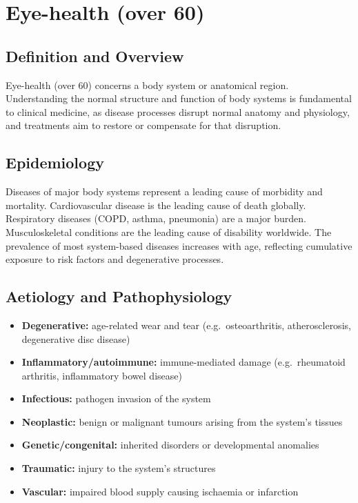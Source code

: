 \chapter{Eye-health (over 60)}

\section*{Definition and Overview}
Eye-health (over 60) concerns a body system or anatomical region. Understanding the normal structure and function of body systems is fundamental to clinical medicine, as disease processes disrupt normal anatomy and physiology, and treatments aim to restore or compensate for that disruption.

\section*{Epidemiology}
Diseases of major body systems represent a leading cause of morbidity and mortality. Cardiovascular disease is the leading cause of death globally. Respiratory diseases (COPD, asthma, pneumonia) are a major burden. Musculoskeletal conditions are the leading cause of disability worldwide. The prevalence of most system-based diseases increases with age, reflecting cumulative exposure to risk factors and degenerative processes.

\section*{Aetiology and Pathophysiology}
\begin{itemize}
    \item \textbf{Degenerative:} age-related wear and tear (e.g.\ osteoarthritis, atherosclerosis, degenerative disc disease)
    \item \textbf{Inflammatory/autoimmune:} immune-mediated damage (e.g.\ rheumatoid arthritis, inflammatory bowel disease)
    \item \textbf{Infectious:} pathogen invasion of the system
    \item \textbf{Neoplastic:} benign or malignant tumours arising from the system's tissues
    \item \textbf{Genetic/congenital:} inherited disorders or developmental anomalies
    \item \textbf{Traumatic:} injury to the system's structures
    \item \textbf{Vascular:} impaired blood supply causing ischaemia or infarction
\end{itemize}

